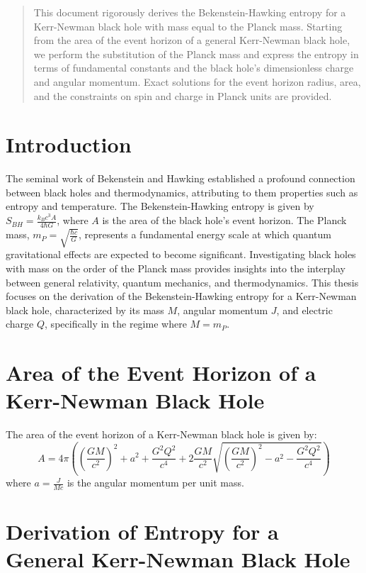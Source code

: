 	
	
	\begin{abstract}
		This document rigorously derives the Bekenstein-Hawking entropy for a Kerr-Newman black hole with mass equal to the Planck mass. Starting from the area of the event horizon of a general Kerr-Newman black hole, we perform the substitution of the Planck mass and express the entropy in terms of fundamental constants and the black hole's dimensionless charge and angular momentum. Exact solutions for the event horizon radius, area, and the constraints on spin and charge in Planck units are provided.
	\end{abstract}
	
	\section{Introduction}
	
	The seminal work of Bekenstein and Hawking established a profound connection between black holes and thermodynamics, attributing to them properties such as entropy and temperature. The Bekenstein-Hawking entropy is given by $S_{BH} = \frac{k_B c^3 A}{4 \hbar G}$, where $A$ is the area of the black hole's event horizon. The Planck mass, $m_P = \sqrt{\frac{\hbar c}{G}}$, represents a fundamental energy scale at which quantum gravitational effects are expected to become significant. Investigating black holes with mass on the order of the Planck mass provides insights into the interplay between general relativity, quantum mechanics, and thermodynamics. This thesis focuses on the derivation of the Bekenstein-Hawking entropy for a Kerr-Newman black hole, characterized by its mass $M$, angular momentum $J$, and electric charge $Q$, specifically in the regime where $M = m_P$.
	
	\section{Area of the Event Horizon of a Kerr-Newman Black Hole}
	
	The area of the event horizon of a Kerr-Newman black hole is given by:
	$$A = 4 \pi \left( \left(\frac{G M}{c^2}\right)^2 + a^2 + \frac{G^2 Q^2}{c^4} + 2 \frac{G M}{c^2} \sqrt{\left(\frac{G M}{c^2}\right)^2 - a^2 - \frac{G^2 Q^2}{c^4}} \right)$$
	where $a = \frac{J}{M c}$ is the angular momentum per unit mass.
	
	\section{Derivation of Entropy for a General Kerr-Newman Black Hole}
	
